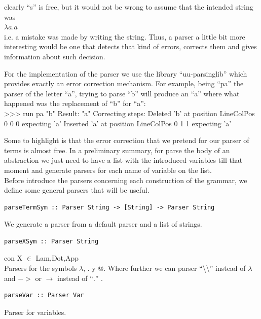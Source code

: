 \documentclass[a4paper,10pt]{article}
\newenvironment{code}{\footnotesize\verbatim}{\endverbatim\normalsize}
\begin{document}
clearly ``s'' is free, but it would not be wrong to assume that the intended string was\\

$\lambda a . a$\\

i.e. a mistake was made by writing the string. Thus, a parser a little bit
more interesting would be one that detects that kind of errors, corrects them
and gives information about such decision.

For the implementation of the parser we use the library ``uu-parsinglib''
which provides exactly an error correction mechanism. For example, being ``pa'' the
parser of the letter ``a'', trying to parse ``b'' will produce an ``a'' where what 
happened was the replacement of ``b'' for ``a'':\\

\begin{code}
 >>> run pa  "b"
     Result: "a"
     Correcting steps: 
       Deleted   'b' at position LineColPos 0 0 0 expecting 'a'
       Inserted  'a' at position LineColPos 0 1 1 expecting 'a'
\end{code}

Some to highlight is that the error correction that we pretend for our parser
of terms is almost free. In a preliminary summary, for parse the body of an 
abstraction we just need to have a list with the introduced variables till that
moment and generate parsers for each name of variable on the list.\\

Before introduce the parsers concerning each construction of the grammar, 
we define some general parsers that will be useful.

\begin{lstlisting}
parseTermSym :: Parser String -> [String] -> Parser String
\end{lstlisting}
We generate a parser from a default parser and a list of strings.

\begin{lstlisting}
parseXSym :: Parser String
\end{lstlisting} con X $\in$ {Lam,Dot,App}\\
Parsers for the symbols $\lambda$, $.$ y $@$. Where further we can
parser ``\textbackslash \textbackslash'' instead of $\lambda$ and $->$ or $\rightarrow$
instead of ``$.$'' .

\begin{lstlisting}
parseVar :: Parser Var
\end{lstlisting} Parser for variables.\\
\end{document}
